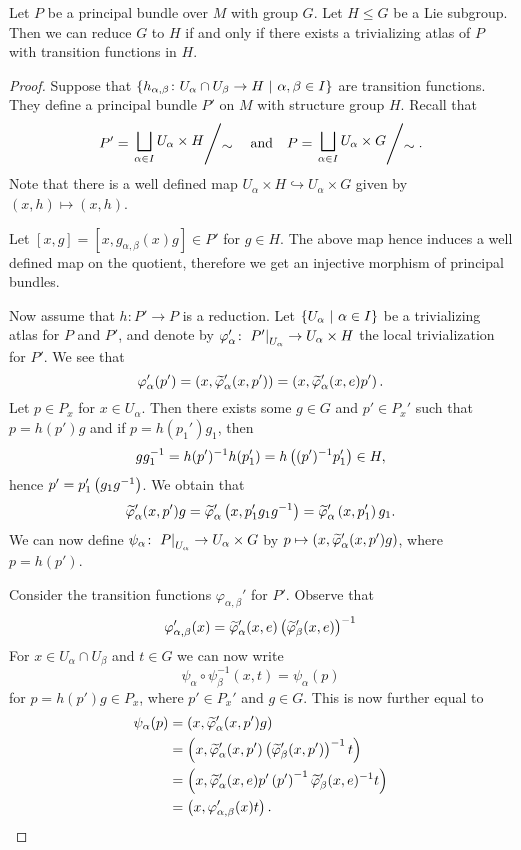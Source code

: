 \begin{trditev}
Let $P$ be a principal bundle over $M$ with group $G$. Let
$H \leq G$ be a Lie subgroup. Then we can reduce $G$ to $H$ if and
only if there exists a trivializing atlas of $P$ with transition
functions in $H$.
\end{trditev}


\begin{proof}
Suppose that
$\left\{h_{\alpha, \beta} \colon U_\alpha \cap U_\beta \to H~\middle\vert~\alpha, \beta \in I\right\}$
are transition functions. They define a principal bundle $P'$ on
$M$ with structure group $H$. Recall that
\[
P' =
\kvoc{\displaystyle \bigsqcup_{\alpha \in I} U_\alpha \times H}
{\sim}
\quad \text{and} \quad
P =
\kvoc{\displaystyle \bigsqcup_{\alpha \in I} U_\alpha \times G}
{\sim}.
\]
Note that there is a well defined map
$U_\alpha \times H \hookrightarrow U_\alpha \times G$ given by
$(x,h) \mapsto (x,h)$.

Let $[x,g] = [x, g_{\alpha, \beta}(x) g] \in P'$ for $g \in H$.
The above map hence induces a well defined map on the quotient,
therefore we get an injective morphism of principal bundles.

Now assume that $h \colon P' \to P$ is a reduction. Let
$\left\{U_\alpha~\middle\vert~\alpha \in I\right\}$ be a trivializing atlas for $P$ and
$P'$, and denote by
$\varphi_\alpha' \colon
\left. P'\right|_{U_\alpha}^{} \to U_\alpha \times H$
the local trivialization for $P'$. We see that
\[
\varphi_\alpha'(p') =
\left(x, \widetilde{\varphi}_\alpha'(x, p')\right) =
\left(x, \widetilde{\varphi}_\alpha'(x,e) p'\right).
\]
Let $p \in P_x$ for $x \in U_\alpha$. Then there exists some
$g \in G$ and $p' \in P_x'$ such that $p = h(p') g$ and if
$p = h(p_1') g_1$, then
\[
g g_1^{-1} =
h(p')^{-1} h(p_1') =
h \left((p')^{-1} p_1'\right) \in H,
\]
hence $p' = p_1' \left(g_1 g^{-1}\right)$. We obtain that
\[
\widetilde{\varphi}_\alpha' (x, p') g =
\widetilde{\varphi}_\alpha' \left(x, p_1' g_1 g^{-1}\right) =
\widetilde{\varphi}_\alpha' \left(x, p_1'\right) g_1.
\]
We can now define
$\psi_\alpha \colon \left. P\right|_{U_\alpha}^{} \to U_\alpha \times G$ by
$p \mapsto \left(x, \widetilde{\varphi}_\alpha' (x, p') g\right)$, where
$p = h(p')$.

Consider the transition functions $\varphi_{\alpha, \beta}'$ for
$P'$. Observe that
\[
\varphi_{\alpha, \beta}'(x) =
\widetilde{\varphi}_\alpha'(x,e)
\left(\widetilde{\varphi}_\beta'(x,e)\right)^{-1}
\]
For $x \in U_\alpha \cap U_\beta$ and $t \in G$ we can now write
\[
\psi_\alpha \circ \psi_\beta^{-1}(x, t) =
\psi_\alpha(p)
\]
for $p = h(p') g \in P_x$, where $p' \in P_x'$ and $g \in G$. This
is now further equal to
\begin{align*}
\psi_\alpha(p) &=
\left(x, \widetilde{\varphi}_\alpha'(x, p') g\right)
\\
&=
\left(x, \widetilde{\varphi}_\alpha'(x,p')
\left(\widetilde{\varphi}_\beta'(x, p')\right)^{-1} t\right)
\\
&=
\left(x, \widetilde{\varphi}_\alpha'(x,e) p' \left(p'\right)^{-1}
\widetilde{\varphi}_\beta'(x, e)^{-1} t\right)
\\
&=
\left(x, \varphi_{\alpha, \beta}'(x) t\right). \qedhere
\end{align*}
\end{proof}

